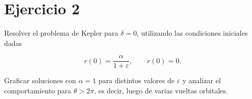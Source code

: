 \documentclass[10pt,a4paper]{article}
\begin{document}
\newpage


\section*{Ejercicio 2}

Resolver el problema de Kepler para $\delta = 0$, utilizando las condiciones iniciales dadas

\[
r(0)=\frac{\alpha}{1+\varepsilon},
\qquad
\dot r(0)=0.
\]

Graficar soluciones con $\alpha = 1$ para distintos valores de $\varepsilon$ y analizar el comportamiento para $\theta > 2\pi$, es decir, luego de varias vueltas orbitales.

\vspace{0.5cm}
\end{document}
